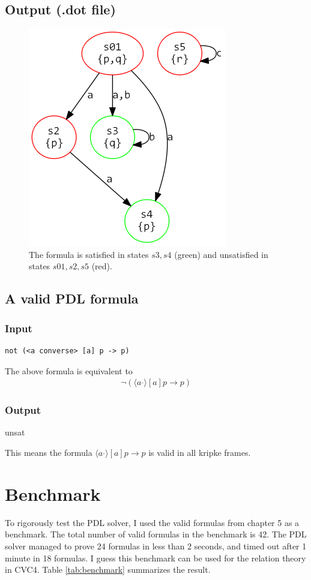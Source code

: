 \documentclass[12pt,a4paper]{article}
\begin{document}
\subsection*{Output (.dot file)}

\begin{figure}[H]
\center
\includegraphics[scale=0.4]{example2.png}

\caption{The formula is satisfied in states $s3, s4$ (green) and unsatisfied in states $s01, s2, s5$ (red). }
\end{figure}


\subsection{A valid PDL formula}
\subsubsection*{Input}
\begin{verbatim}
not (<a converse> [a] p -> p)
\end{verbatim}
The above formula is equivalent to 
\begin{align*}
\neg(\langle a^{\_} \rangle [a] p \rightarrow p)
\end{align*}

\subsubsection*{Output}
unsat


This means the formula $\langle a^{\_} \rangle [a] p \rightarrow p$ is valid in all kripke frames.
\section{Benchmark}
To rigorously test the PDL solver, I used the valid formulas from chapter 5 as a benchmark. The total number of valid formulas in the benchmark is 42. The PDL solver managed to prove 24 formulas in less than 2 seconds, and timed out after 1 minute in 18 formulas.  I guess this benchmark can be used for the relation theory in CVC4. Table \ref{tab:benchmark} summarizes the result. 
\end{document}
